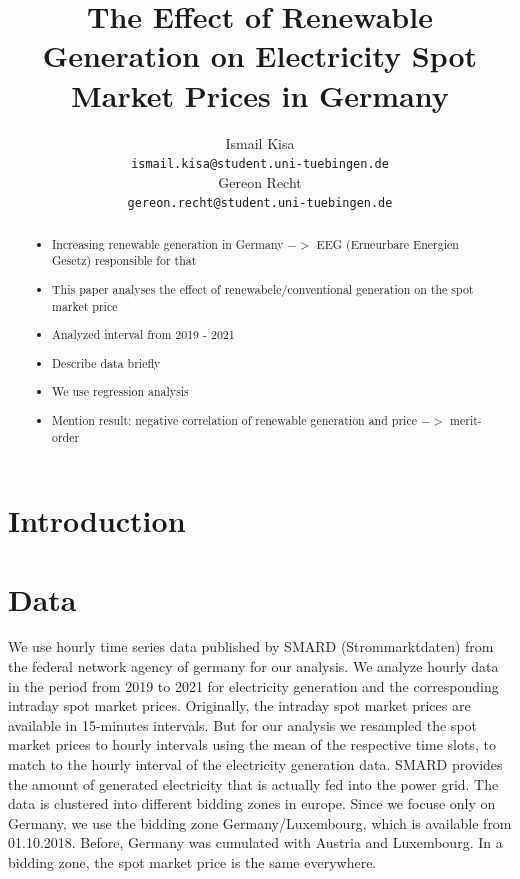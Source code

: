 \documentclass{article}
\title{The Effect of Renewable Generation on Electricity Spot Market Prices in Germany}
\author{%
Ismail Kisa\\
\texttt{ismail.kisa@student.uni-tuebingen.de}\\
\And Gereon Recht\\
\texttt{gereon.recht@student.uni-tuebingen.de} \\
}
\begin{document}
\maketitle

\begin{abstract}
\begin{itemize}
    \item Increasing renewable generation in Germany $->$ EEG (Erneurbare Energien Gesetz) responsible for that
    \item This paper analyses the effect of renewabele/conventional generation on the spot market price
    \item Analyzed interval from 2019 - 2021
    \item Describe data briefly
    \item We use regression analysis
    \item Mention result: negative correlation of renewable generation and price $->$ merit-order
\end{itemize}


\end{abstract}

\section{Introduction}

\section{Data}
We use hourly time series data published by SMARD (Strommarktdaten) from the federal network agency of germany for our analysis. We analyze hourly data in the period from 2019 to 2021 for electricity generation and the corresponding intraday spot market prices. Originally, the intraday spot market prices are available in 15-minutes intervals. But for our analysis we resampled the spot market prices to hourly intervals using the mean of the respective time slots, to match to the hourly interval of the electricity generation data. SMARD provides the amount of generated electricity that is actually fed into the power grid. The data is clustered into different bidding zones in europe. Since we focuse only on Germany, we use the bidding zone Germany/Luxembourg, which is available from 01.10.2018. Before, Germany was cumulated with Austria and Luxembourg. In a bidding zone, the spot market price is the same everywhere.
\end{document}

